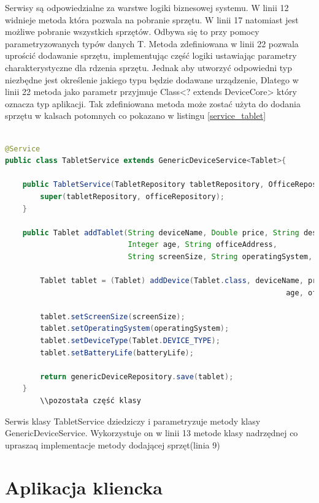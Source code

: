 Serwisy są odpowiedzialne za warstwe logiki biznesowej systemu. W linii 12 widnieje metoda która pozwala na pobranie sprzętu. W linii 17 natomiast jest możliwe pobranie wszystkich sprzętów. Odbywa się to przy pomocy parametryzowanych typów danych T. Metoda zdefiniowana w linii 22 pozwala uprościć dodawanie sprzętu, implementując część logiki ustawiając parametry charakterystyczne dla rdzenia sprzętu. Jednak aby utworzyć odpowiedni typ niezbędne jest określenie jakiego typu będzie dodawane urządzenie, Dlatego w linii 22 metoda jako parametr przyjmuje Class<? extends DeviceCore> który oznacza typ aplikacji. Tak zdefiniowana metoda może zostać użyta do dodania sprzętu w kalsach potomnych co pokazano w listingu \ref{service_tablet}

\begin{lstlisting}[language=Java, style=JavaStyle,  caption={Klasa potomna serwisu tabletu: TabletService }, label={service_tablet}]

@Service
public class TabletService extends GenericDeviceService<Tablet>{

    public TabletService(TabletRepository tabletRepository, OfficeRepository officeRepository){
        super(tabletRepository, officeRepository);
    }

    public Tablet addTablet(String deviceName, Double price, String description,
                            Integer age, String officeAddress,
                            String screenSize, String operatingSystem, String batteryLife){

        Tablet tablet = (Tablet) addDevice(Tablet.class, deviceName, price, description,
                                                                age, officeAddress);

        tablet.setScreenSize(screenSize);
        tablet.setOperatingSystem(operatingSystem);
        tablet.setDeviceType(Tablet.DEVICE_TYPE);
        tablet.setBatteryLife(batteryLife);

        return genericDeviceRepository.save(tablet);
    }
		\\pozostała część klasy
\end{lstlisting}

Serwis klasy TabletService dziedziczy i parametryzuje metody klasy GenericDeviceService. Wykorzystuje on w linii 13 metode klasy nadrzędnej co upraszaq implementacje metody dodającej sprzęt(linia 9)



\section {Aplikacja kliencka}

